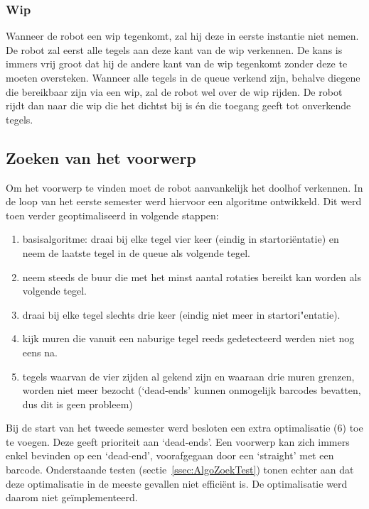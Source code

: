 \documentclass[tt3]{penoverslag}
\begin{document}
\subsubsection{Wip}
\label{ssec:AlgoWip}
Wanneer de robot een wip tegenkomt, zal hij deze in eerste instantie niet nemen. De robot zal eerst alle tegels aan deze kant van de wip verkennen. De kans is immers vrij groot dat hij de andere kant van de wip tegenkomt zonder deze te moeten oversteken. Wanneer alle tegels in de queue verkend zijn, behalve diegene die bereikbaar zijn via een wip, zal de robot wel over de wip rijden. De robot rijdt dan naar die wip die het dichtst bij is \'en die toegang geeft tot onverkende tegels.


\subsection{Zoeken van het voorwerp} %
\label{ssec:AlgoZoek}
Om het voorwerp te vinden moet de robot aanvankelijk het doolhof verkennen. In de loop van het eerste semester werd hiervoor een algoritme ontwikkeld. Dit werd toen verder geoptimaliseerd in volgende stappen: 

\begin{enumerate}
\item basisalgoritme: draai bij elke tegel vier keer (eindig in startori\"entatie) en neem de laatste tegel in de queue als volgende tegel.
\item neem steeds de buur die met het minst aantal rotaties bereikt kan worden als volgende tegel.
\item draai bij elke tegel slechts drie keer (eindig niet meer in startori"entatie).
\item kijk muren die vanuit een naburige tegel reeds gedetecteerd werden  niet nog eens na.
\item tegels waarvan de vier zijden al gekend zijn en waaraan drie muren grenzen, worden niet meer bezocht (`dead-ends' kunnen onmogelijk barcodes bevatten, dus dit is geen probleem)
\end{enumerate}

Bij de start van het tweede semester werd besloten een extra optimalisatie (6) toe te voegen. Deze geeft prioriteit aan `dead-ends'. Een voorwerp kan zich immers enkel bevinden op een `dead-end', voorafgegaan door een `straight' met een barcode. Onderstaande testen (sectie~\ref{ssec:AlgoZoekTest}) tonen echter aan dat deze optimalisatie in de meeste gevallen niet effici\"ent is. De optimalisatie werd daarom niet ge\"implementeerd.\\
\end{document}
